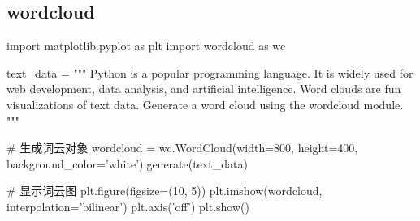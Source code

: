   \subsection{wordcloud}
    \begin{codeblock}[language=python, caption={wordcloud}]
      import matplotlib.pyplot as plt
      import wordcloud as wc

      text_data = """
      Python is a popular programming language.
      It is widely used for web development, data analysis, and artificial intelligence.
      Word clouds are fun visualizations of text data.
      Generate a word cloud using the wordcloud module.
      """

      # 生成词云对象
      wordcloud = wc.WordCloud(width=800, height=400, background_color='white').generate(text_data)

      # 显示词云图
      plt.figure(figsize=(10, 5))
      plt.imshow(wordcloud, interpolation='bilinear')
      plt.axis('off')
      plt.show()
    \end{codeblock}
